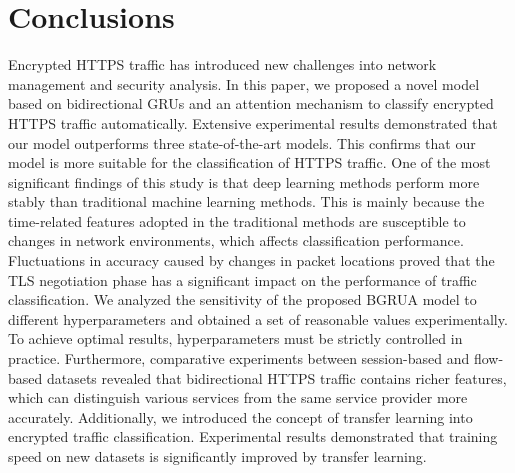 \documentclass[preprint,12pt]{elsarticle}
\begin{document}
\section{Conclusions}
Encrypted HTTPS traffic has introduced new challenges into network management and security analysis. In this paper, we proposed a novel model based on bidirectional GRUs and an attention mechanism to classify encrypted HTTPS traffic automatically. Extensive experimental results demonstrated that our model outperforms three state-of-the-art models. This confirms that our model is more suitable for the classification of HTTPS traffic. One of the most significant findings of this study is that deep learning methods perform more stably than traditional machine learning methods. This is mainly because the time-related features adopted in the traditional methods are susceptible to changes in network environments, which affects classification performance. Fluctuations in accuracy caused by changes in packet locations proved that the TLS negotiation phase has a significant impact on the performance of traffic classification. We analyzed the sensitivity of the proposed BGRUA model to different hyperparameters and obtained a set of reasonable values experimentally. To achieve optimal results, hyperparameters must be strictly controlled in practice. Furthermore, comparative experiments between session-based and flow-based datasets revealed that bidirectional HTTPS traffic contains richer features, which can distinguish various services from the same service provider more accurately. Additionally, we introduced the concept of transfer learning into encrypted traffic classification. Experimental results demonstrated that training speed on new datasets is significantly improved by transfer learning.

\normalem


\end{document}
